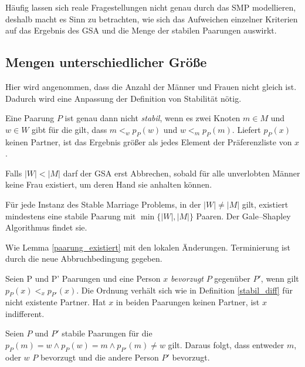 Häufig lassen sich reale Fragestellungen nicht genau durch das SMP modellieren, deshalb macht es Sinn  zu betrachten, wie sich das Aufweichen einzelner Kriterien auf das Ergebnis des GSA und die Menge der stabilen Paarungen auswirkt.

\subsection{Mengen unterschiedlicher Größe}
\label{subsec:size}

Hier wird angenommen, dass die Anzahl der Männer und Frauen nicht gleich ist. Dadurch wird eine Anpassung der Definition von Stabilität nötig.

\begin{Definition}
\label{stabil_diff}
  Eine Paarung $P$ ist genau dann nicht \textit{stabil}, wenn es zwei Knoten $m \in M$ und $w \in W$ gibt für die gilt, dass $m <_{w} p_{P}(w)$ und $w <_{m} p_{P}(m)$. Liefert $p_{P}(x)$ keinen Partner, ist das Ergebnis größer als jedes Element der Präferenzliste von $x$.
\end{Definition}

Falls $|W| < |M|$ darf der GSA erst Abbrechen, sobald für alle unverlobten Männer keine Frau existiert, um deren Hand sie anhalten können.

\begin{Theorem}
\label{paarung_existiert_diff}
  Für jede Instanz des Stable Marriage Problems, in der $|W| \neq |M|$ gilt, existiert mindestens eine stabile Paarung mit $\min\{|W|,|M|\}$ Paaren. Der Gale–Shapley Algorithmus findet sie.
\end{Theorem}

\begin{Beweis}
\label{paarung_existiert_diff_bew}
  Wie Lemma \ref{paarung_existiert} mit den lokalen Änderungen. Terminierung ist durch die neue Abbruchbedingung gegeben.
\end{Beweis}

\begin{Definition}
\label{vorziehen}
  Seien P und P' Paarungen und eine Person $x$ \textit{bevorzugt} $P$ gegenüber $P'$, wenn gilt $p_{P}(x) <_{x} p_{P'}(x)$. Die Ordnung verhält sich wie in Definition \ref{stabil_diff} für nicht existente Partner. Hat $x$ in beiden Paarungen keinen Partner, ist $x$ indifferent.
\end{Definition}

\begin{Lemma}
\label{strikte_ordnung}
  Seien $P$ und $P'$ stabile Paarungen für die $p_{P}(m) = w \land p_{P}(w) = m \land p_{P'}(m) \neq w$ gilt. Daraus folgt, dass entweder $m$, oder $w$ $P$ bevorzugt und die andere Person $P'$ bevorzugt.
\end{Lemma}

